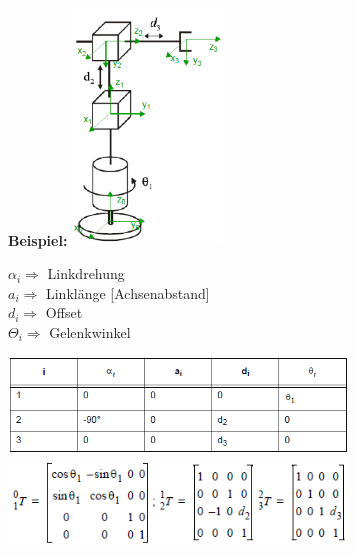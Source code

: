 \begin{minipage}{3cm}
\textbf{Beispiel:}
\includegraphics[width=4cm]{./bilder/denavit_grafik.png} \\
\end{minipage}
\begin{minipage}{6cm}
$\alpha_{i} \Longrightarrow $ Linkdrehung  \\
$ a_{i} \Longrightarrow $ Linklänge [Achsenabstand] \\
$ d_{i} \Longrightarrow $ Offset \\
$ \Theta_{i} \Longrightarrow $ Gelenkwinkel \\ 
\end{minipage}
\begin{minipage}{8cm}
\includegraphics[width=9cm]{./bilder/denavit_tabelle.png} \\
\includegraphics[width=9cm]{./bilder/denavit_matrix.png} \\
\end{minipage} \\





\newpage

